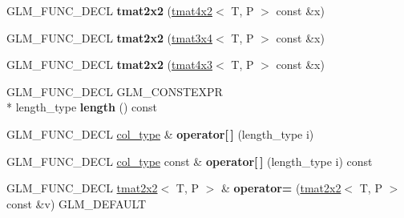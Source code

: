 \begin{DoxyCompactItemize}
\item 
\hypertarget{structglm_1_1tmat2x2_a2b93452f02650013e4a1321fd5e57d30}{G\-L\-M\-\_\-\-F\-U\-N\-C\-\_\-\-D\-E\-C\-L {\bfseries tmat2x2} (\hyperlink{structglm_1_1tmat4x2}{tmat4x2}$<$ T, P $>$ const \&x)}\label{structglm_1_1tmat2x2_a2b93452f02650013e4a1321fd5e57d30}

\item 
\hypertarget{structglm_1_1tmat2x2_ab1332d12bd623745023705b101ec84fd}{G\-L\-M\-\_\-\-F\-U\-N\-C\-\_\-\-D\-E\-C\-L {\bfseries tmat2x2} (\hyperlink{structglm_1_1tmat3x4}{tmat3x4}$<$ T, P $>$ const \&x)}\label{structglm_1_1tmat2x2_ab1332d12bd623745023705b101ec84fd}

\item 
\hypertarget{structglm_1_1tmat2x2_a9354991f96b3b87e4d98805d239d9c2e}{G\-L\-M\-\_\-\-F\-U\-N\-C\-\_\-\-D\-E\-C\-L {\bfseries tmat2x2} (\hyperlink{structglm_1_1tmat4x3}{tmat4x3}$<$ T, P $>$ const \&x)}\label{structglm_1_1tmat2x2_a9354991f96b3b87e4d98805d239d9c2e}

\item 
\hypertarget{structglm_1_1tmat2x2_afee64f4d9132d19bb459845f7b4799c4}{G\-L\-M\-\_\-\-F\-U\-N\-C\-\_\-\-D\-E\-C\-L G\-L\-M\-\_\-\-C\-O\-N\-S\-T\-E\-X\-P\-R \\*
length\-\_\-type {\bfseries length} () const }\label{structglm_1_1tmat2x2_afee64f4d9132d19bb459845f7b4799c4}

\item 
\hypertarget{structglm_1_1tmat2x2_ae9e51d1d6b2d5f3ed9e42da1945b7998}{G\-L\-M\-\_\-\-F\-U\-N\-C\-\_\-\-D\-E\-C\-L \hyperlink{structglm_1_1tvec2}{col\-\_\-type} \& {\bfseries operator\mbox{[}$\,$\mbox{]}} (length\-\_\-type i)}\label{structglm_1_1tmat2x2_ae9e51d1d6b2d5f3ed9e42da1945b7998}

\item 
\hypertarget{structglm_1_1tmat2x2_a50d3c00e93963e2db8b306a4d5922cf1}{G\-L\-M\-\_\-\-F\-U\-N\-C\-\_\-\-D\-E\-C\-L \hyperlink{structglm_1_1tvec2}{col\-\_\-type} const \& {\bfseries operator\mbox{[}$\,$\mbox{]}} (length\-\_\-type i) const }\label{structglm_1_1tmat2x2_a50d3c00e93963e2db8b306a4d5922cf1}

\item 
\hypertarget{structglm_1_1tmat2x2_abb686405aaffa60fa1be364dc88447c5}{G\-L\-M\-\_\-\-F\-U\-N\-C\-\_\-\-D\-E\-C\-L \hyperlink{structglm_1_1tmat2x2}{tmat2x2}$<$ T, P $>$ \& {\bfseries operator=} (\hyperlink{structglm_1_1tmat2x2}{tmat2x2}$<$ T, P $>$ const \&v) G\-L\-M\-\_\-\-D\-E\-F\-A\-U\-L\-T}\label{structglm_1_1tmat2x2_abb686405aaffa60fa1be364dc88447c5}


\end{DoxyCompactItemize}

